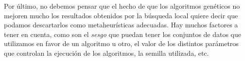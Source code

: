 \documentclass[12pt]{article}
\begin{document}
Por último, no debemos pensar que el hecho de que los algoritmos genéticos no mejoren mucho los resultados obtenidos por la búsqueda local quiere decir que podamos descartarlos como metaheurísticas adecuadas. Hay muchos factores a tener en cuenta, como son el \textit{sesgo} que puedan tener los conjuntos de datos que utilizamos en favor de un algoritmo u otro, el valor de los distintos parámetros que controlan la ejecución de los algoritmos, la semilla utilizada, etc. 
\end{document}
